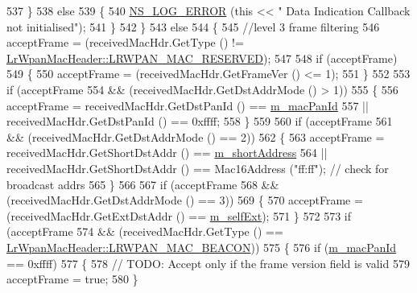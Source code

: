 \begin{DoxyCode}
537             \}
538           \textcolor{keywordflow}{else}
539             \{
540               \hyperlink{group__logging_ga0261a8db1d4ac5f79417d117634fd455}{NS\_LOG\_ERROR} (\textcolor{keyword}{this} << \textcolor{stringliteral}{" Data Indication Callback not initialised"});
541             \}
542         \}
543       \textcolor{keywordflow}{else}
544         \{
545           \textcolor{comment}{//level 3 frame filtering}
546           acceptFrame = (receivedMacHdr.GetType () != 
      \hyperlink{classns3_1_1LrWpanMacHeader_a09363d4738e8ab00b82db8268b65d7a0ae3fb9f8497adcc664c79a392bd0f6fe8}{LrWpanMacHeader::LRWPAN\_MAC\_RESERVED});
547 
548           \textcolor{keywordflow}{if} (acceptFrame)
549             \{
550               acceptFrame = (receivedMacHdr.GetFrameVer () <= 1);
551             \}
552 
553           \textcolor{keywordflow}{if} (acceptFrame
554               && (receivedMacHdr.GetDstAddrMode () > 1))
555             \{
556               acceptFrame = receivedMacHdr.GetDstPanId () == \hyperlink{classns3_1_1LrWpanMac_abb75c742ae20c41dd10a721605328a82}{m\_macPanId}
557                 || receivedMacHdr.GetDstPanId () == 0xffff;
558             \}
559 
560           \textcolor{keywordflow}{if} (acceptFrame
561               && (receivedMacHdr.GetDstAddrMode () == 2))
562             \{
563               acceptFrame = receivedMacHdr.GetShortDstAddr () == \hyperlink{classns3_1_1LrWpanMac_a6886e840ca3a1986b93db966c58ed415}{m\_shortAddress}
564                 || receivedMacHdr.GetShortDstAddr () == Mac16Address (\textcolor{stringliteral}{"ff:ff"});        \textcolor{comment}{// check for
       broadcast addrs}
565             \}
566 
567           \textcolor{keywordflow}{if} (acceptFrame
568               && (receivedMacHdr.GetDstAddrMode () == 3))
569             \{
570               acceptFrame = (receivedMacHdr.GetExtDstAddr () == \hyperlink{classns3_1_1LrWpanMac_ad519d2851f7d2e15c5cbc8c9bdee3f97}{m\_selfExt});
571             \}
572 
573           \textcolor{keywordflow}{if} (acceptFrame
574               && (receivedMacHdr.GetType () == 
      \hyperlink{classns3_1_1LrWpanMacHeader_a09363d4738e8ab00b82db8268b65d7a0a43b1d580f710b65ea2839b2f4b64127a}{LrWpanMacHeader::LRWPAN\_MAC\_BEACON}))
575             \{
576               \textcolor{keywordflow}{if} (\hyperlink{classns3_1_1LrWpanMac_abb75c742ae20c41dd10a721605328a82}{m\_macPanId} == 0xffff)
577                 \{
578                   \textcolor{comment}{// TODO: Accept only if the frame version field is valid}
579                   acceptFrame = \textcolor{keyword}{true};
580                 \}

\end{DoxyCode}
